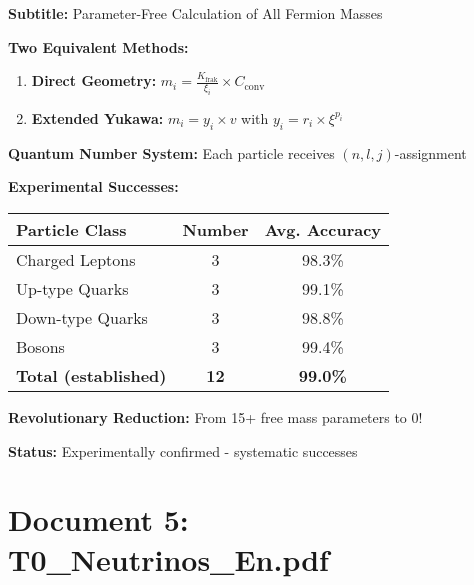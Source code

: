 \documentclass[12pt,a4paper]{article}
\newcommand{\xipar}{\xi}
\begin{document}
	\begin{documentbox}
		\textbf{Subtitle:} Parameter-Free Calculation of All Fermion Masses
		
		\textbf{Two Equivalent Methods:}
		\begin{enumerate}
			\item \textbf{Direct Geometry:} $m_i = \frac{K_{\text{frak}}}{\xi_i} \times C_{\text{conv}}$
			\item \textbf{Extended Yukawa:} $m_i = y_i \times v$ with $y_i = r_i \times \xipar^{p_i}$
		\end{enumerate}
		
		\textbf{Quantum Number System:} Each particle receives $(n,l,j)$-assignment
		
		\textbf{Experimental Successes:}
		\begin{center}
			\begin{tabular}{lcc}
				\toprule
				\textbf{Particle Class} & \textbf{Number} & \textbf{Avg. Accuracy} \\
				\midrule
				Charged Leptons & 3 & 98.3\% \\
				Up-type Quarks & 3 & 99.1\% \\
				Down-type Quarks & 3 & 98.8\% \\
				Bosons & 3 & 99.4\% \\
				\midrule
				\textbf{Total (established)} & \textbf{12} & \textbf{99.0\%} \\
				\bottomrule
			\end{tabular}
		\end{center}
		
		\textbf{Revolutionary Reduction:} From 15+ free mass parameters to 0!
		
		\textbf{Status:} Experimentally confirmed - systematic successes
	\end{documentbox}
	
	\section{Document 5: T0\_Neutrinos\_En.pdf}
	
\end{document}
